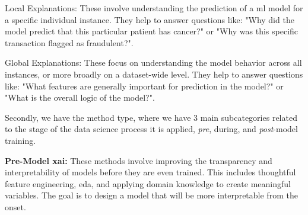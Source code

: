 Local Explanations: These involve understanding the prediction of a \ac{ml} model for a specific individual instance. They help to answer questions like: "Why did the model predict that this particular patient has cancer?" or "Why was this specific transaction flagged as fraudulent?". 

Global Explanations: These focus on understanding the model behavior across all instances, or more broadly on a dataset-wide level. They help to answer questions like: "What features are generally important for prediction in the model?" or "What is the overall logic of the model?". 

Secondly, we have the method type, where we have 3 main subcategories related to the stage of the data science process it is applied, \textit{pre}, during, and \textit{post}-model training.

\textbf{Pre-Model \ac{xai}:} These methods involve improving the transparency and interpretability of models before they are even trained. This includes thoughtful feature engineering, \ac{eda}, and applying domain knowledge to create meaningful variables. The goal is to design a model that will be more interpretable from the onset.

